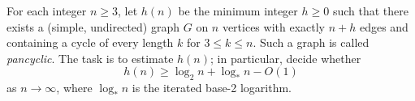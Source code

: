 For each integer $n\ge 3$, let $h(n)$ be the minimum integer $h\ge 0$ such that there exists a (simple, undirected) graph $G$ on $n$ vertices with exactly $n+h$ edges and containing a cycle of every length $k$ for $3\le k\le n$. Such a graph is called \emph{pancyclic}. The task is to estimate $h(n)$; in particular, decide whether
\[
h(n)\ge \log_2 n + \log_* n - O(1)
\]
as $n\to\infty$, where $\log_* n$ is the iterated base-2 logarithm.
